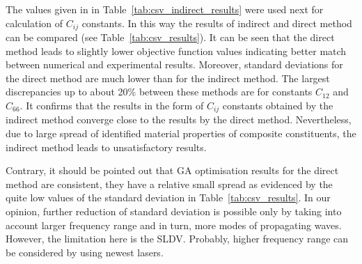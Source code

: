 \documentclass[preprint,12pt]{elsarticle}
\begin{document}
The values given in  in Table~\ref{tab:csv_indirect_results} were used next for 
calculation of \(C_{ij}\) constants. In this way the results of indirect and direct method 
can be compared (see Table~\ref{tab:csv_results}). It can be seen that the direct 
method leads to slightly lower objective function values indicating better match between 
numerical and experimental results. Moreover, standard deviations for the direct 
method are much lower than for the indirect method. The largest discrepancies up to 
about 20\% between these methods are for constants \(C_{12}\) and \(C_{66}\). It 
confirms that the results in the form of \(C_{ij}\) constants obtained by the indirect 
method converge close to the results by the direct method. Nevertheless, due to large 
spread of identified material properties of composite constituents, the indirect method 
leads to unsatisfactory results. 

Contrary, it should be pointed out that GA optimisation results for the direct method are consistent, they have a relative small spread as evidenced by the quite low values of the standard deviation in Table~\ref{tab:csv_results}. In our opinion, further reduction of standard deviation is possible only by taking into account larger frequency range and in turn, more modes of propagating waves. However, the limitation here is the SLDV. Probably, higher frequency range can be considered by using newest lasers. 

\end{document}
